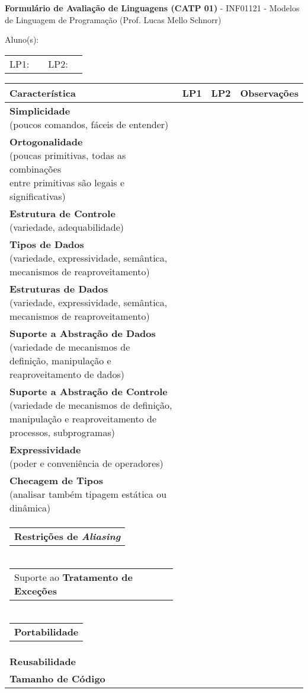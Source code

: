 \documentclass[11pt,portuguese]{article}
\makeatletter
\newcommand{\specialcell}[2][c]{%
  \begin{tabular}[#1]{@{}l@{}}#2\end{tabular}}
\makeatother
\begin{document}
\begin{doublespace}
\noindent
{\bf Formulário de Avaliação de Linguagens (CATP 01)} - INF01121 - Modelos de Linguagem de Programação (Prof. Lucas Mello Schnorr)

\noindent
Aluno(s): \hrulefill \\
\noindent
\begin{tabularx}{\textwidth}{|cX|cX}
LP1: & \hrulefill & LP2: & \hrulefill \\
\end{tabularx}
\end{doublespace}

\noindent
\begin{tabularx}{\textwidth}{p{10.5cm}|c|c|X}
Característica & {\bf LP1} & {\bf LP2} & Observações \\\hline
\specialcell{{\bf Simplicidade}\\(poucos comandos, fáceis de entender)}   &&&\\\hline
\specialcell{{\bf Ortogonalidade}\\(poucas primitivas, todas as combinações \\entre primitivas são legais e significativas)}   &&&\\\hline
\specialcell{{\bf Estrutura de Controle}\\(variedade, adequabilidade)}   &&&\\\hline
\specialcell{{\bf Tipos de Dados}\\(variedade, expressividade, semântica, \\mecanismos de reaproveitamento)}   &&&\\\hline
\specialcell{{\bf Estruturas de Dados}\\(variedade, expressividade, semântica, \\mecanismos de reaproveitamento)}    &&&\\\hline
\specialcell{{\bf Suporte a Abstração de Dados}\\(variedade de mecanismos de \\definição, manipulação e reaproveitamento de dados)}     &&&\\\hline
\specialcell{{\bf Suporte a Abstração de Controle}\\(variedade de mecanismos de definição, \\manipulação e reaproveitamento de processos, subprogramas)}     &&&\\\hline
\specialcell{{\bf Expressividade}\\(poder e conveniência de operadores)}    &&&\\\hline
\specialcell{{\bf Checagem de Tipos}\\(analisar também tipagem estática ou dinâmica)}     &&&\\\hline
\specialcell{{\bf Restrições de \emph{Aliasing}}}   &&&\\\hline
\specialcell{Suporte ao {\bf Tratamento de Exceções}}      &&&\\\hline
\specialcell{{\bf Portabilidade}}     &&&\\\hline
{\bf Reusabilidade}    &&&\\\hline
{\bf Tamanho de Código}     &&&\\\hline
\end{tabularx}
\end{document}
